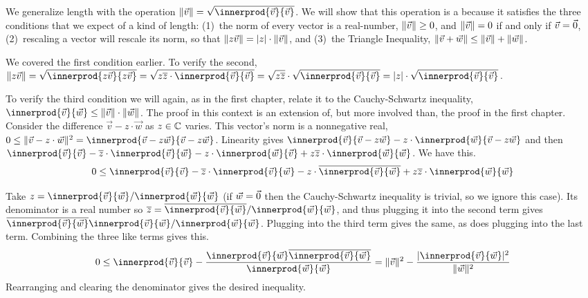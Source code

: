 \def\smashdp#1{{\setbox0=\hbox{$#1$}\dp0=0pt \box0\relax}}
We generalize length with the operation 
$\norm{\vec{v}}=\sqrt{\smashdp{\innerprod{\vec{v}}{\vec{v}}}}$.
We will show that this operation is a  
because it satisfies the
three conditions that we expect of a kind of length: 
(1)~the norm of every vector is a real-number, $\lVert\vec{v}\rVert\geq 0$, 
and $\lVert\vec{v}\rVert= 0$ if and only if $\vec{v}=\vec{0}$, 
(2)~rescaling a vector will rescale 
its norm, so that $\lVert z\vec{v}\rVert=\lvert z\rvert\cdot\lVert\vec{v}\rVert$, and 
(3)~the Triangle Inequality, 
$\lVert\vec{v}+\vec{w}\rVert\leq\lVert\vec{v}\rVert+\lVert\vec{w}\rVert$.

We covered the first condition earlier.
To verify the second, 
$\norm{z\vec{v}}
=\sqrt{\smashdp{\innerprod{z\vec{v}}{z\vec{v}}}}
=\sqrt{\smashdp{z\compconj{z}\cdot\innerprod{\vec{v}}{\vec{v}}}}
=\sqrt{z\compconj{z}}\cdot\sqrt{\smashdp{\innerprod{\vec{v}}{\vec{v}}}}
=\absval{z}\cdot\sqrt{\smashdp{\innerprod{\vec{v}}{\vec{v}}}}$.

To verify the third condition we will again, as in the first
chapter, relate it to the Cauchy-Schwartz inequality,
$\innerprod{\vec{v}}{\vec{w}}\leq \norm{\vec{v}}\cdot\norm{\vec{w}}$.
The proof in this context is an extension of, but more involved than, the 
proof in the first chapter. 
Consider the difference $\vec{v}-z\cdot\vec{w}$ as $z\in\mathbb{C}$ varies.
This vector's norm is a nonnegative real,
$0\leq \norm{\vec{v}-z\cdot\vec{w}}^2
   =\innerprod{\vec{v}-z\vec{w}}{\vec{v}-z\vec{w}}$.
Linearity gives
$\innerprod{\vec{v}}{\vec{v}-z\vec{w}}
  -z\cdot\innerprod{\vec{w}}{\vec{v}-z\vec{w}}$
and then
$\innerprod{\vec{v}}{\vec{v}}
  -\compconj{z}\cdot\innerprod{\vec{v}}{\vec{w}}
  -z\cdot\innerprod{\vec{w}}{\vec{v}}
  +z\compconj{z}\cdot\innerprod{\vec{w}}{\vec{w}}$.
We have this.
\begin{equation*}
 0
  \leq\innerprod{\vec{v}}{\vec{v}}
  -\compconj{z}\cdot\innerprod{\vec{v}}{\vec{w}}
  -z\cdot\compconj{\innerprod{\vec{v}}{\vec{w}}}
  +z\compconj{z}\cdot\innerprod{\vec{w}}{\vec{w}}
\end{equation*}

Take 
$z=\innerprod{\vec{v}}{\vec{w}}/\innerprod{\vec{w}}{\vec{w}}$
(if $\vec{w}=\vec{0}$ then the Cauchy-Schwartz inequality is trivial, so we
ignore this case).
Its denominator is a real number so
$\compconj{z}=\compconj{\innerprod{\vec{v}}{\vec{w}}}/\innerprod{\vec{w}}{\vec{w}}$,
and thus plugging it into the second term gives 
$\compconj{\innerprod{\vec{v}}{\vec{w}}}\innerprod{\vec{v}}{\vec{w}}/\innerprod{\vec{w}}{\vec{w}}$.
Plugging into the third term gives the same,
as does plugging into the last term.
Combining the three like terms gives this.
\begin{equation*}
 0
  \leq\innerprod{\vec{v}}{\vec{v}}
  -\frac{\innerprod{\vec{v}}{\vec{w}}\compconj{\innerprod{\vec{v}}{\vec{w}}}}{\innerprod{\vec{w}}{\vec{w}}}
  =\norm{\vec{v}}^2
  -\frac{\absval{\innerprod{\vec{v}}{\vec{w}}}^2}{\norm{\vec{w}}^2}
\end{equation*}
Rearranging and clearing the denominator gives the desired 
inequality.

